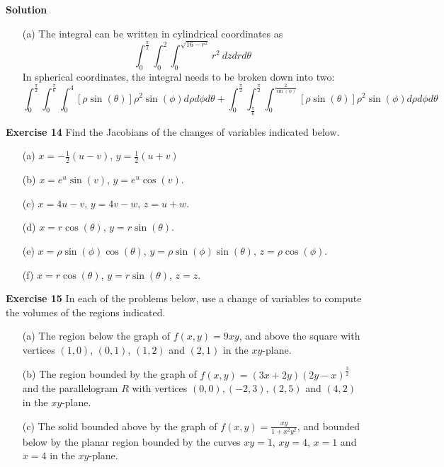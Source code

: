 \documentclass[12pt,oneside]{exam}
\newenvironment{exercise}[1]{\vspace{.1in}\noindent\textbf{Exercise #1 \hspace{.05em}}}{}
\newenvironment{newsolution}{\vspace{.1in}\noindent\textbf{Solution \hspace{.05em}}}{}
\begin{document}
\begin{newsolution}
\begin{itemize}
\item[(a)] The integral can be written in cylindrical coordinates as 
\begin{equation*}
\int_{0}^{\frac{\pi}{2}} \int_{0}^{2} \int_{0}^{\sqrt{16-r^2}}  r^2\    dz dr d\theta
\end{equation*}
In spherical coordinates, the integral needs to be broken down into two:
\begin{equation*}
\int_{0}^{\frac{\pi}{2}} \int_{0}^{\frac{\pi}{6}} \int_{0}^{4} [\rho\sin(\theta)] \rho^2\sin(\phi) d\rho d\phi d \theta + \int_{0}^{\frac{\pi}{2}} \int_{\frac{\pi}{6}}^{\frac{\pi}{2}} \int_{0}^{\frac{2}{\sin(\phi)}} [\rho\sin(\theta)] \rho^2\sin(\phi) d\rho d\phi d\theta
\end{equation*}
\end{itemize}
\end{newsolution}

\begin{exercise}{14}
Find the Jacobians of the changes of variables indicated below. 
\begin{itemize}
\item[(a)] $x=-\frac{1}{2}(u-v)$, $y=\frac{1}{2}(u+v)$
\item[(b)] $x=e^u\sin(v)$, $y=e^u\cos(v)$. 
\item[(c)] $x=4u-v$, $y=4v-w$, $z=u+w$. 
\item[(d)] $x=r\cos(\theta)$, $y=r\sin(\theta)$.
\item[(e)]  $x=\rho \sin(\phi) \cos(\theta)$, $y=\rho \sin(\phi) \sin(\theta)$, $z=\rho \cos(\phi)$.
\item[(f)] $x=r\cos(\theta)$, $y=r\sin(\theta)$, $z=z$. 
\end{itemize}
\end{exercise}

\begin{exercise}{15} 
In each of the problems below, use a change of variables to compute the volumes of the regions indicated. 
\begin{itemize}
\item[(a)] The region below the graph of $f(x,y)=9xy$, and above the square with vertices $(1,0)$, $(0,1)$, $(1,2)$ and $(2,1)$ in the $xy$-plane. 
\item[(b)] The region bounded by the graph of $f(x,y)=(3x+2y)(2y-x)^{\frac{3}{2}}$ and the parallelogram $R$ with vertices $(0,0), (-2,3), (2,5)$ and $(4,2)$ in the $xy$-plane. 
\item[(c)] The solid bounded above by the graph of $f(x,y)=\frac{xy}{1+x^2y^2}$, and bounded below by the planar region bounded by the curves $xy=1$, $xy=4$, $x=1$ and $x=4$ in the $xy$-plane. 
\end{itemize}
\end{exercise}
\end{document}
